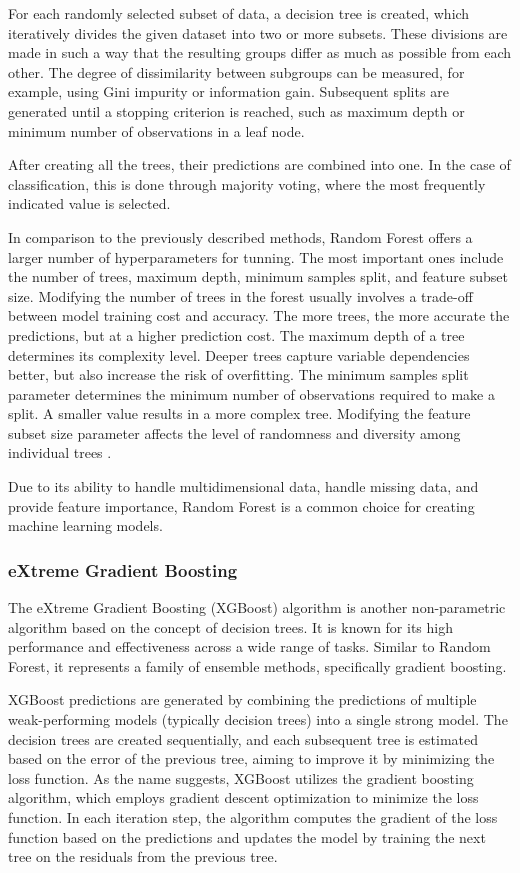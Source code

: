 For each randomly selected subset of data, a decision tree is created, which iteratively divides the given dataset into two or more subsets. These divisions are made in such a way that the resulting groups differ as much as possible from each other. The degree of dissimilarity between subgroups can be measured, for example, using Gini impurity or information gain. Subsequent splits are generated until a stopping criterion is reached, such as maximum depth or minimum number of observations in a leaf node.

After creating all the trees, their predictions are combined into one. In the case of classification, this is done through majority voting, where the most frequently indicated value is selected.

In comparison to the previously described methods, Random Forest offers a larger number of hyperparameters for tunning. The most important ones include the number of trees, maximum depth, minimum samples split, and feature subset size. Modifying the number of trees in the forest usually involves a trade-off between model training cost and accuracy. The more trees, the more accurate the predictions, but at a higher prediction cost. The maximum depth of a tree determines its complexity level. Deeper trees capture variable dependencies better, but also increase the risk of overfitting. The minimum samples split parameter determines the minimum number of observations required to make a split. A smaller value results in a more complex tree. Modifying the feature subset size parameter affects the level of randomness and diversity among individual trees \autocite{Breiman2001}.

Due to its ability to handle multidimensional data, handle missing data, and provide feature importance, Random Forest is a common choice for creating machine learning models.

\subsubsection{eXtreme Gradient Boosting}
The eXtreme Gradient Boosting (XGBoost) algorithm is another non-parametric algorithm based on the concept of decision trees. It is known for its high performance and effectiveness across a wide range of tasks. Similar to Random Forest, it represents a family of ensemble methods, specifically gradient boosting.

XGBoost predictions are generated by combining the predictions of multiple weak-performing models (typically decision trees) into a single strong model. The decision trees are created sequentially, and each subsequent tree is estimated based on the error of the previous tree, aiming to improve it by minimizing the loss function. As the name suggests, XGBoost utilizes the gradient boosting algorithm, which employs gradient descent optimization to minimize the loss function. In each iteration step, the algorithm computes the gradient of the loss function based on the predictions and updates the model by training the next tree on the residuals from the previous tree.

